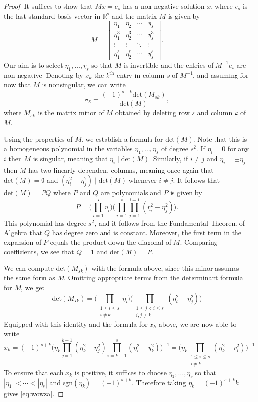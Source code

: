 \documentclass[oneside,hidelinks,indentfirst,10pt]{book}
\begin{document}
\begin{proof}
It suffices to show that \(Mx=e_s\) has a non-negative solution \(x\), where \(e_s\) is the last standard basis vector in \(\mathbb{R}^s\) and the matrix \(M\) is given by
\[
    M=\begin{bmatrix}
    \eta_1&\eta_2&\cdots &\eta_s\\
    \eta_1^3&\eta_2^3&\cdots&\eta_s^{3}\\
    \vdots&\vdots&\ddots&\vdots\\
    \eta_1^\ell &\eta_2^\ell &\cdots&\eta_s^\ell 
    \end{bmatrix}.
\]
Our aim is to select \(\eta_1,\dots,\eta_s\) so that \(M\) is invertible and the entries of \(M^{-1}e_s\) are non-negative. Denoting by \(x_k\) the \(k^\mathrm{th}\) entry in column \(s\) of \(M^{-1}\), and assuming for now that \(M\) is nonsingular, we can write
\[
    x_k=\frac{(-1)^{s+k}\mathrm{det}(M_{sk})}{\mathrm{det}(M)},
\]
where \(M_{sk}\) is the matrix minor of \(M\) obtained by deleting row \(s\) and column \(k\) of \(M\). 
    

Using the properties of \(M\), we establish a formula for \(\mathrm{det}(M)\). Note that this is a homogeneous polynomial in the variables \(\eta_1,\dots,\eta_s\) of degree \(s^2\). If \(\eta_i=0\) for any \(i\) then \(M\) is singular, meaning that \(\eta_i\mid \mathrm{det}(M)\). Similarly, if \(i\neq j\) and \(\eta_i=\pm\eta_j\) then \(M\) has two linearly dependent columns, meaning once again that \(\mathrm{det}(M)=0\) and \((\eta_i^2-\eta_j^2)\mid \mathrm{det}(M)\) whenever \(i\neq j\). It follows that \(\mathrm{det}(M)=PQ\) where \(P\) and \(Q\) are polynomials and \(P\) is given by
\[
    P=\bigg(\prod_{i=1}^s\eta_i\bigg)\bigg(\prod_{i=1}^s\prod_{j=1}^{i-1}(\eta_i^2-\eta_j^2)\bigg).
\]
This polynomial has degree \(s^2\), and it follows from the Fundamental Theorem of Algebra that \(Q\) has degree zero and is constant. Moreover, the first term in the expansion of \(P\) equals the product down the diagonal of \(M\). Comparing coefficients, we see that \(Q=1\) and \(\mathrm{det}(M)=P\).


We can compute \(\mathrm{det}(M_{sk})\) with the formula above, since this minor assumes the same form as \(M\). Omitting appropriate terms from the determinant formula for \(M\), we get
\[
    \mathrm{det}(M_{sk})=\bigg(\prod_{\substack{1\leq i\leq s\\
    i\neq k}}\eta_i\bigg)\bigg(\prod_{\substack{1\leq j< i\leq s\\i,j\neq k}}(\eta_i^2-\eta_j^2)\bigg)
\]
Equipped with this identity and the formula for \(x_k\) above, we are now able to write
\[
    x_k=(-1)^{s+k}\bigg(\eta_k\prod_{j=1}^{k-1}(\eta_k^2-\eta_j^2)\prod_{i=k+1}^s(\eta_i^2-\eta_k^2)\bigg)^{-1}=\bigg(\eta_k\prod_{\substack{1\leq i\leq s\\i\neq k}}(\eta_k^2-\eta_i^2)\bigg)^{-1}
\]
To ensure that each \(x_k\) is positive, it suffices to choose \(\eta_1,\dots,\eta_s\) so that \(|\eta_1|<\cdots<|\eta_s|\) and \(\mathrm{sgn}(\eta_k)=(-1)^{s+k}\). Therefore taking \(\eta_k=(-1)^{s+k}k\) gives \eqref{eq:wowza}.
\end{proof}
\end{document}
